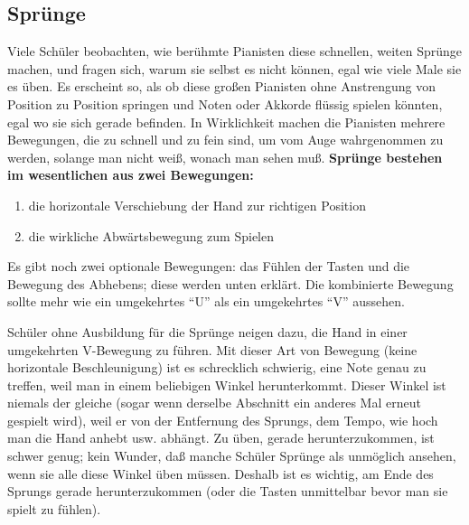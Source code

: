 
\subsection{Sprünge}
\label{c1iii7f}

Viele Schüler beobachten, wie berühmte Pianisten diese schnellen, weiten Sprünge machen, und fragen sich, warum sie selbst es nicht können, egal wie viele Male sie es üben.
Es erscheint so, als ob diese großen Pianisten ohne Anstrengung von Position zu Position springen und Noten oder Akkorde flüssig spielen könnten, egal wo sie sich gerade befinden.
In Wirklichkeit machen die Pianisten mehrere Bewegungen, die zu schnell und zu fein sind, um vom Auge wahrgenommen zu werden, solange man nicht weiß, wonach man sehen muß.
\textbf{Sprünge bestehen im wesentlichen aus zwei Bewegungen:}

\begin{enumerate}[label={\arabic*.}] 
 \item die horizontale Verschiebung der Hand zur richtigen Position
 \item die wirkliche Abwärtsbewegung zum Spielen
\end{enumerate}

Es gibt noch zwei optionale Bewegungen: das Fühlen der Tasten und die Bewegung des Abhebens; diese werden unten erklärt.
Die kombinierte Bewegung sollte mehr wie ein umgekehrtes \enquote{U} als ein umgekehrtes \enquote{V} aussehen.

Schüler ohne Ausbildung für die Sprünge neigen dazu, die Hand in einer umgekehrten V-Bewegung zu führen.
Mit dieser Art von Bewegung (keine horizontale Beschleunigung) ist es schrecklich schwierig, eine Note genau zu treffen, weil man in einem beliebigen Winkel herunterkommt.
Dieser Winkel ist niemals der gleiche (sogar wenn derselbe Abschnitt ein anderes Mal erneut gespielt wird), weil er von der Entfernung des Sprungs, dem Tempo, wie hoch man die Hand anhebt usw. abhängt.
Zu üben, gerade herunterzukommen, ist schwer genug; kein Wunder, daß manche Schüler Sprünge als unmöglich ansehen, wenn sie alle diese Winkel üben müssen.
Deshalb ist es wichtig, am Ende des Sprungs gerade herunterzukommen (oder die Tasten unmittelbar bevor man sie spielt zu fühlen).

